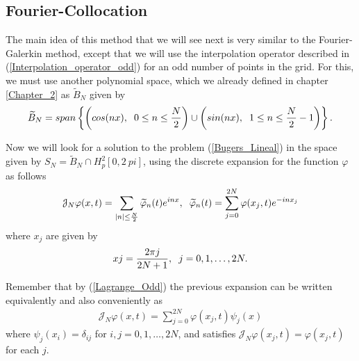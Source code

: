 \subsection{Fourier-Collocation}
	\label{Collocation}
	
	The main idea of ​​this method that we will see next is very similar to the Fourier-Galerkin method, except that we will use the interpolation operator described in (\ref{Interpolation_operator_odd}) for an odd number of points in the grid. For this, we must use another polynomial space, which we already defined in chapter \ref{Chapter_2} as $\widetilde{B}_N$ given by
	\begin{align*}
		\widetilde{B}_N = span\left\{\left(cos(nx), \hspace{0.2cm} 0 \leq n \leq \frac{N}{2} \right)\cup  \left(sin(nx), \hspace{0.2cm} 1 \leq n \leq \frac{N}{2} - 1 \right)\right\}.
	\end{align*} 
	
	Now we will look for a solution to the problem (\ref{Bugers_Lineal}) in the space given by $S_N = \widetilde{B}_N \cap H^2_p [0, 2 \ pi]$, using the discrete expansion for the function $\varphi$ as follows
	\begin{align}
	\label{Discrete_phi}		
		\mathcal{J}_N \varphi (x, t) =  \displaystyle \sum_{|n| \leq \frac{N}{2}} \widetilde{\varphi}_n (t) e^{inx}, \hspace{2mm}
			\widetilde{\varphi}_n (t) =  \displaystyle \sum_{j=0}^{2N} \varphi (x_j, t)  e^{-in x_j}
	\end{align} 
	where $x_j$ are given by
	\begin{align*}
		xj = \frac{2 \pi j}{2N + 1}, \hspace{2mm} j = 0, 1, \dots, 2N.
	\end{align*}
	
	Remember that by (\ref{Lagrange_Odd}) the previous expansion can be written equivalently and also conveniently as
	\begin{align*}
		\mathcal{J}_N \varphi (x, t) =  \displaystyle \sum_{j=0}^{2N} \varphi (x_j, t) \psi_j (x)
	\end{align*}
	where $\psi_j (x_i) = \delta_{ij}$ for $i, j = 0, 1, \dots, 2N$, and satisfies $\mathcal{J}_N \varphi (x_j, t) = \varphi (x_j, t)$ for each $j$.
	
